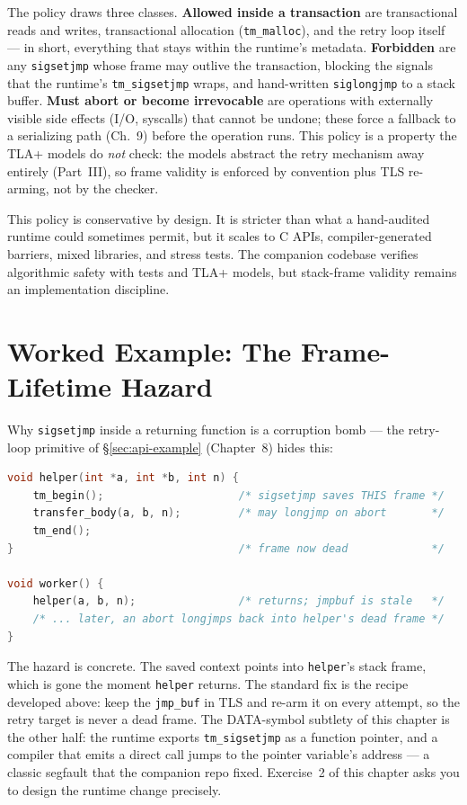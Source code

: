 The policy draws three classes. \textbf{Allowed inside a transaction} are transactional reads and writes, transactional allocation (\texttt{tm\_malloc}), and the retry loop itself --- in short, everything that stays within the runtime's metadata. \textbf{Forbidden} are any \texttt{sigsetjmp} whose frame may outlive the transaction, blocking the signals that the runtime's \texttt{tm\_sigsetjmp} wraps, and hand-written \texttt{siglongjmp} to a stack buffer. \textbf{Must abort or become irrevocable} are operations with externally visible side effects (I/O, syscalls) that cannot be undone; these force a fallback to a serializing path (Ch.~9) before the operation runs. This policy is a property the TLA+ models do \emph{not} check: the models abstract the retry mechanism away entirely (Part~III), so frame validity is enforced by convention plus TLS re-arming, not by the checker.

This policy is conservative by design.  It is stricter than what a hand-audited runtime could sometimes permit, but it scales to C APIs, compiler-generated barriers, mixed libraries, and stress tests.  The companion codebase verifies algorithmic safety with tests and TLA+ models, but stack-frame validity remains an implementation discipline.

\section{Worked Example: The Frame-Lifetime Hazard}
\label{sec:jmpbuf-example}

Why \texttt{sigsetjmp} inside a returning function is a corruption bomb ---
the retry-loop primitive of \S\ref{sec:api-example} (Chapter~8) hides this:

\begin{lstlisting}[language=C, caption={A transaction that outlives its own frame.}]
void helper(int *a, int *b, int n) {
    tm_begin();                     /* sigsetjmp saves THIS frame */
    transfer_body(a, b, n);         /* may longjmp on abort       */
    tm_end();
}                                   /* frame now dead             */

void worker() {
    helper(a, b, n);                /* returns; jmpbuf is stale   */
    /* ... later, an abort longjmps back into helper's dead frame */
}
\end{lstlisting}

The hazard is concrete. The saved context points into \texttt{helper}'s stack frame, which is gone the moment \texttt{helper} returns. The standard fix is the recipe developed above: keep the \texttt{jmp\_buf} in TLS and re-arm it on every attempt, so the retry target is never a dead frame. The DATA-symbol subtlety of this chapter is the other half: the runtime exports \texttt{tm\_sigsetjmp} as a function pointer, and a compiler that emits a direct call jumps to the pointer variable's address --- a classic segfault that the companion repo fixed. Exercise~2 of this chapter asks you to design the runtime change precisely.

